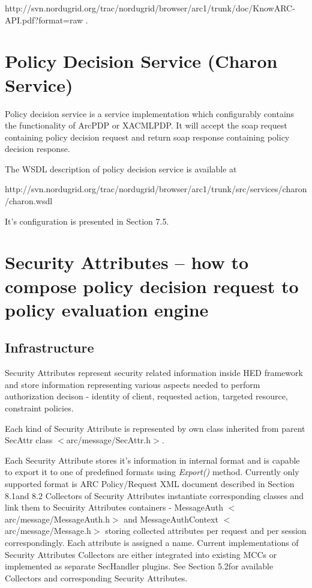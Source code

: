 \documentclass{article}                            %
\begin{document}
http://svn.nordugrid.org/trac/nordugrid/browser/arc1/trunk/doc/KnowARC-API.pdf?format=raw .



\section{Policy Decision Service (Charon Service)} %
\label{sec:policy_decision_service}
Policy decision service is a service implementation which configurably contains the functionality of ArcPDP or XACMLPDP. It will accept the soap request containing policy decision request and return soap response containing policy decision response.

The WSDL description of policy decision service is available at

 http://svn.nordugrid.org/trac/nordugrid/browser/arc1/trunk/src/services/charon/charon.wsdl

It's configuration is presented in Section 7.5. 



\section{Security Attributes -- how to compose policy decision request to policy evaluation engine} %
\label{sec:sec_attributes}

\subsection{Infrastructure} %
\label{subsec:sec_attr_infrastructure}

Security Attributes represent security related information inside HED framework and store information representing various aspects needed to perform authorization decison - identity of client, requested action, targeted resource, constraint policies.

Each kind of Security Attribute is represented by own class inherited from parent SecAttr class $<$arc/message/SecAttr.h$>$. 

Each Security Attribute stores it's information in internal format and is capable to export it to one of predefined formats using \textit{Export()} method. Currently only supported format is ARC Policy/Request XML document described in Section 8.1and 8.2
Collectors of Security Attributes instantiate corresponding classes and link them to Secuirity Attributes containers - MessageAuth $<$arc/message/MessageAuth.h$>$ and MessageAuthContext $<$arc/message/Message.h$>$ storing collected attributes per request and per session correspondingly. Each attribute is assigned a name. Current implementations of Security Attributes Collectors are either integrated into existing MCCs or implemented as separate SecHandler plugins. See Section 5.2for available Collectors and corresponding Security Attributes. 
\end{document}
